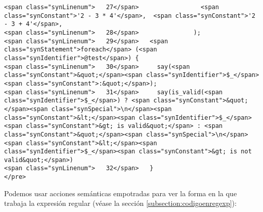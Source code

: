 \begin{verbatim}
<span class="synLinenum">   27</span>                 <span class="synConstant">'2 - 3 * 4'</span>,  <span class="synConstant">'2 - 3 + 4'</span>,
<span class="synLinenum">   28</span>               );
<span class="synLinenum">   29</span>   <span class="synStatement">foreach</span> (<span class="synIdentifier">@test</span>) {
<span class="synLinenum">   30</span>     say(<span class="synConstant">&quot;</span><span class="synIdentifier">$_</span><span class="synConstant">:&quot;</span>);
<span class="synLinenum">   31</span>     say(is_valid(<span class="synIdentifier">$_</span>) ? <span class="synConstant">&quot;</span><span class="synSpecial">\n</span><span class="synConstant">&lt;</span><span class="synIdentifier">$_</span><span class="synConstant">&gt; is valid&quot;</span> : <span class="synConstant">&quot;</span><span class="synSpecial">\n</span><span class="synConstant">&lt;</span><span class="synIdentifier">$_</span><span class="synConstant">&gt; is not valid&quot;</span>)
<span class="synLinenum">   32</span>   }
</pre>

\end{verbatim}
Podemos usar acciones semánticas empotradas para 
ver la forma en la que trabaja la expresión regular
(véase la sección
\ref{subsection:codigoenregexp}):


